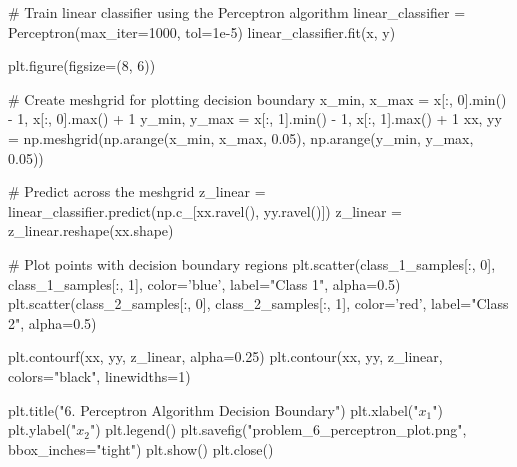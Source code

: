 \documentclass{article}
\begin{document}
{\begin{spverbatim}
# Train linear classifier using the Perceptron algorithm
linear_classifier = Perceptron(max_iter=1000, tol=1e-5)
linear_classifier.fit(x, y)

plt.figure(figsize=(8, 6))

# Create meshgrid for plotting decision boundary
x_min, x_max = x[:, 0].min() - 1, x[:, 0].max() + 1
y_min, y_max = x[:, 1].min() - 1, x[:, 1].max() + 1
xx, yy = np.meshgrid(np.arange(x_min, x_max, 0.05),
                     np.arange(y_min, y_max, 0.05))

# Predict across the meshgrid
z_linear = linear_classifier.predict(np.c_[xx.ravel(), yy.ravel()])
z_linear = z_linear.reshape(xx.shape)

# Plot points with decision boundary regions
plt.scatter(class_1_samples[:, 0], class_1_samples[:, 1], color='blue', label="Class 1", alpha=0.5)
plt.scatter(class_2_samples[:, 0], class_2_samples[:, 1], color='red', label="Class 2", alpha=0.5)

plt.contourf(xx, yy, z_linear, alpha=0.25)
plt.contour(xx, yy, z_linear, colors="black", linewidths=1)

plt.title("6. Perceptron Algorithm Decision Boundary")
plt.xlabel("$x_1$")
plt.ylabel("$x_2$")
plt.legend()
plt.savefig("problem_6_perceptron_plot.png", bbox_inches="tight")
plt.show()
plt.close()
\end{spverbatim}

}
\end{document}
